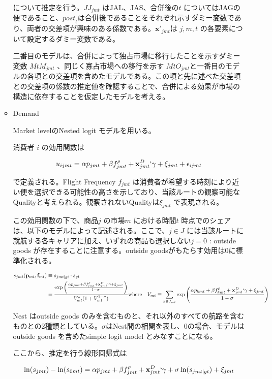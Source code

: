\documentclass{jsarticle}
\begin{document}
\begin{enumerate}
\begin{itemize}
について推定を行う。$\textit{JJ}_{jmt}$ はJAL、JAS、合併後の$t$ についてはJAGの便であること、$\textit{post}_t $は合併後であることをそれぞれ示すダミー変数であり、両者の交差項が興味のある係数である。$\mathbf{x}'_{jmt}$は $j, m, t$ の各要素について設定するダミー変数である。

二番目のモデルは、合併によって独占市場に移行したことを示すダミー変数 $\textit{MtM}_{jmt}$ 、同じく寡占市場への移行を示す $\textit{MtO}_{jmt}$と一番目のモデルの各項との交差項を含めたモデルである。この項と先に述べた交差項との交差項の係数の推定値を確認することで、合併による効果が市場の構造に依存することを仮定したモデルを考える。

\item Demand

Market levelのNested logit モデルを用いる。

消費者 $i$ の効用関数は

\[u_{ijmt} = \alpha p_{jmt} +\beta f_{jmt}^{\rho} +\mathbf{x}^{D}_{jmt} ` \gamma + \xi_{jmt} +\epsilon _{ijmt} \]

で定義される。Flight Frequency $f_{jmt}$ は消費者が希望する時刻により近い便を選択できる可能性の高さを示しており、当該ルートの観察可能なQualityと考えられる。観察されないQualityは$\xi_{jmt}$ で表現される。

この効用関数の下で、商品$j$ の市場$m$ における時間$t$ 時点でのシェアは、以下のモデルによって記述される。ここで、$j \in J$ には当該ルートに就航する各キャリアに加え、いずれの商品も選択しない$j=0 $ : outside goods が存在することに注意する。outside goodsがもたらす効用は0に標準化される。

\begin{align*}
s_{jmt}(\mathbf{p}_{mt},\mathbf{f}_{mt}) & \equiv s_{jmt|gt} \cdot s_{gt} \\
 & = \dfrac{\exp \left( \frac{\alpha p_{jmt} +\beta f_{jmt}^{\rho} +\mathbf{x}^{D}_{jmt} ` \gamma + \xi_{jmt}}{1-\sigma} \right)}{V_{mt}^{\sigma}(1+V_{mt}^{1-\sigma})}
\text{where} & V_{mt} \equiv \sum _{k \in J_{mt}} \exp \left( \dfrac{\alpha p_{kmt} + \beta f_{kmt}^{\rho} +\mathbf{x}^{D}_{jmt} ` \gamma + \xi_{jmt}}{1 - \sigma } \right)
\end{align*}

Nest はoutside goods のみを含むものと、それ以外のすべての航路を含むものとの2種類としている。$\sigma$はNest間の相関を表し、0の場合、モデルはoutside goods を含めたsimple logit model とみなすことになる。

ここから、推定を行う線形回帰式は

\[\ln (s_{jmt}) - \ln (s_{0mt}) = \alpha p_{jmt} + \beta f_{jmt}^{\rho} + \mathbf{x}_{jmt}^D ` \gamma
 + \sigma \ln (s_{jmt | gt}) + \xi_{jmt} \]
 

\end{itemize}
\end{enumerate}
\end{document}
